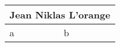 \documentclass[10pt,a4paper]{article}
\begin{document}
\begin{tabularx}{\textwidth}{|X|X|} \hline
  \multicolumn{2}{|c|}{\bf Jean Niklas L'orange} \\ \hline
  a & b \\ \hline
\end{tabularx}
\end{document}
